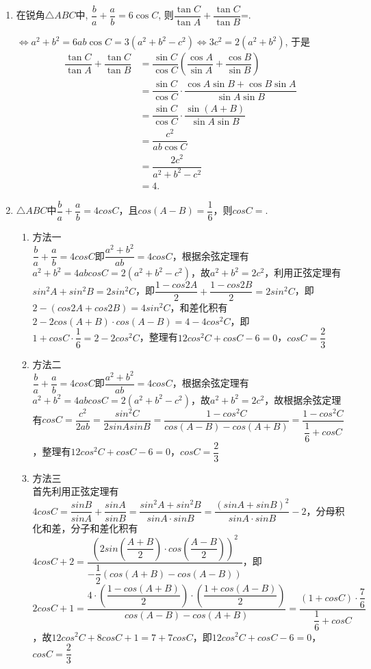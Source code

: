 \begin{enumerate}
\begin{enumerate}
    \item 在锐角$\triangle{ABC}$中, $\dfrac{b}{a}+\dfrac{a}{b}=6\cos{C}$, 则$\dfrac{\tan{C}}{\tan{A}}+\dfrac{\tan{C}}{\tan{B}}$=. 
    \begin{jieda}
    $\iff a^2+b^2=6ab\cos{C}=3(a^2+b^2-c^2)\iff3c^2=2(a^2+b^2)$, 
    于是
    \begin{align*}
    \dfrac{\tan{C}}{\tan{A}}+\dfrac{\tan{C}}{\tan{B}}
    & =\dfrac{\sin{C}}{\cos{C}}\left(\dfrac{\cos{A}}{\sin{A}}+\dfrac{\cos{B}}{\sin{B}}\right)\\
    & =\dfrac{\sin{C}}{\cos{C}}\cdot\dfrac{\cos{A}\sin{B}+\cos{B}\sin{A}}{\sin{A}\sin{B}}\\
    & =\dfrac{\sin{C}}{\cos{C}}\cdot\dfrac{\sin(A+B)}{\sin{A}\sin{B}}\\
    & =\dfrac{c^2}{ab\cos{C}}\\
    & =\dfrac{2c^2}{a^2+b^2-c^2}\\
    & =4.
    \end{align*}
    \end{jieda}
    \item $\triangle ABC$中$\dfrac{b}{a} + \dfrac{a}{b} = 4cosC$，且$cos(A-B) = \dfrac{1}{6}$，则$cosC = $.
    \begin{jieda}
        \begin{enumerate}
            \item 方法一 \\
            $\dfrac{b}{a} + \dfrac{a}{b} = 4cosC$即$\dfrac{a^2+b^2}{ab} = 4cosC$，根据余弦定理有$a^2+b^2 = 4abcosC = 2(a^2+b^2-c^2)$，故$a^2+b^2 = 2c^2$，利用正弦定理有$sin^2A + sin^2B = 2sin^2C$，即$\dfrac{1-cos2A}{2} + \dfrac{1-cos2B}{2} = 2sin^2C$，即$2 - (cos2A + cos2B) = 4sin^2C$，和差化积有$2 - 2cos(A+B) \cdot cos(A-B) = 4-4cos^2C$，即$1+cosC \cdot \dfrac{1}{6} = 2-2cos^2C$，整理有$12cos^2C + cosC - 6 = 0$，$cosC = \dfrac{2}{3}$
            \item 方法二 \\
            $\dfrac{b}{a} + \dfrac{a}{b} = 4cosC$即$\dfrac{a^2+b^2}{ab} = 4cosC$，根据余弦定理有$a^2+b^2 = 4abcosC = 2(a^2+b^2-c^2)$，故$a^2+b^2 = 2c^2$，故根据余弦定理有$cosC = \dfrac{c^2}{2ab} = \dfrac{sin^2C}{2sinAsinB} = \dfrac{1-cos^2C}{cos(A-B) - cos(A+B)} = \dfrac{1-cos^2C}{\dfrac{1}{6}+cosC}$，整理有$12cos^2C + cosC - 6 = 0$，$cosC = \dfrac{2}{3}$
            \item 方法三 \\
            首先利用正弦定理有$4cosC = \dfrac{sinB}{sinA} + \dfrac{sinA}{sinB} = \dfrac{sin^2A + sin^2B}{sinA \cdot sinB} = \dfrac{(sinA + sinB)^2}{sinA \cdot sinB} - 2$，分母积化和差，分子和差化积有$4cosC + 2 = \dfrac{(2sin(\dfrac{A+B}{2}) \cdot cos(\dfrac{A-B}{2}))^2}{-\dfrac{1}{2}(cos(A+B) - cos(A-B))}$，即$2cosC + 1 = \dfrac{4 \cdot (\dfrac{1-cos(A+B)}{2}) \cdot (\dfrac{1+cos(A-B)}{2})}{cos(A-B)-cos(A+B)} = \dfrac{(1+cosC)\cdot\dfrac{7}{6}}{\dfrac{1}{6}+cosC}$，故$12cos^2C + 8cosC + 1 = 7 + 7cosC$，即$12cos^2C + cosC - 6 = 0$，$cosC = \dfrac{2}{3}$
        \end{enumerate}
    \end{jieda}
    

\end{enumerate}
\end{enumerate}
